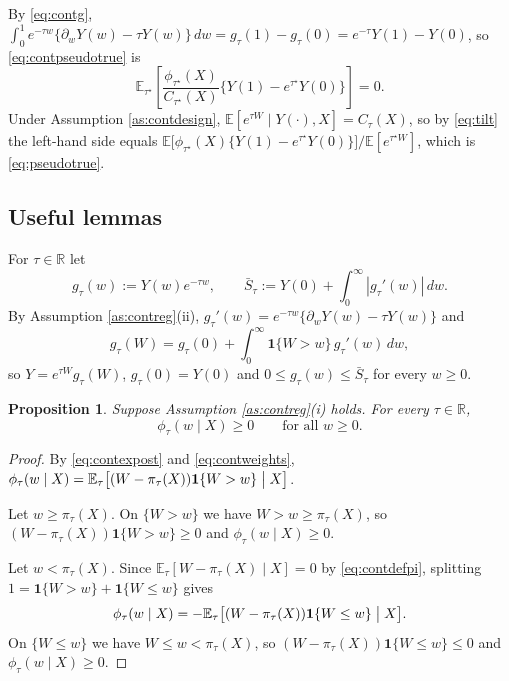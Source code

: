 \documentclass[11pt]{article}
\newtheorem{proposition}[theorem]{Proposition}
\theoremstyle{definition}
\theoremstyle{plain}
\newcommand{\E}{\mathbb{E}}
\newcommand{\1}{\mathbf{1}}
\newcommand{\R}{\mathbb{R}}
\begin{document}
By \eqref{eq:contg}, $\int_0^1 e^{-\tau w}\{\partial_wY(w)-\tau Y(w)\}\,dw=g_\tau(1)-g_\tau(0)=e^{-\tau}Y(1)-Y(0)$, so \eqref{eq:contpseudotrue} is
\[
\E_{\tau^\star}\left[\frac{\phi_{\tau^\star}(X)}{C_{\tau^\star}(X)}\bigl\{Y(1)-e^{\tau^\star}Y(0)\bigr\}\right]=0 .
\]
Under Assumption \ref{as:contdesign}, $\E[e^{\tau W}\mid Y(\cdot),X]=C_\tau(X)$, so by \eqref{eq:tilt} the left-hand side equals $\E\bigl[\phi_{\tau^\star}(X)\{Y(1)-e^{\tau^\star}Y(0)\}\bigr]/\E[e^{\tau^\star W}]$, which is \eqref{eq:pseudotrue}.

\subsection{Useful lemmas}

For $\tau\in\R$ let
\begin{equation}
g_\tau(w):=Y(w)e^{-\tau w},
\qquad
\bar S_\tau:=Y(0)+\int_0^\infty|g_\tau'(w)|\,dw .
\label{eq:contg}
\end{equation}
By Assumption \ref{as:contreg}(ii), $g_\tau'(w)=e^{-\tau w}\bigl\{\partial_wY(w)-\tau Y(w)\bigr\}$ and
\begin{equation}
g_\tau(W)=g_\tau(0)+\int_0^\infty \1\{W>w\}\,g_\tau'(w)\,dw ,
\label{eq:contFTC}
\end{equation}
so $Y=e^{\tau W}g_\tau(W)$, $g_\tau(0)=Y(0)$ and $0\le g_\tau(w)\le\bar S_\tau$ for every $w\ge 0$.
\begin{proposition}
\label{prop:contnonneg}
Suppose Assumption \ref{as:contreg}(i) holds.  For every $\tau\in\R$,
\begin{equation}
\phi_\tau(w\mid X)\ge 0
\qquad\text{for all } w\ge 0 .
\label{eq:contnonneg}
\end{equation}
\end{proposition}

\begin{proof}
By \eqref{eq:contexpost} and \eqref{eq:contweights},
$\phi_\tau(w\mid X)=\E_\tau\bigl[(W-\pi_\tau(X))\1\{W>w\}\bigm| X\bigr]$.

Let $w\ge\pi_\tau(X)$.  On $\{W>w\}$ we have $W>w\ge\pi_\tau(X)$, so $(W-\pi_\tau(X))\1\{W>w\}\ge 0$ and $\phi_\tau(w\mid X)\ge 0$.

Let $w<\pi_\tau(X)$.  Since $\E_\tau[W-\pi_\tau(X)\mid X]=0$ by \eqref{eq:contdefpi}, splitting $1=\1\{W>w\}+\1\{W\le w\}$ gives
\[
\phi_\tau(w\mid X)=-\E_\tau\bigl[(W-\pi_\tau(X))\1\{W\le w\}\bigm| X\bigr].
\]
On $\{W\le w\}$ we have $W\le w<\pi_\tau(X)$, so $(W-\pi_\tau(X))\1\{W\le w\}\le 0$ and $\phi_\tau(w\mid X)\ge 0$.
\end{proof}
\end{document}
